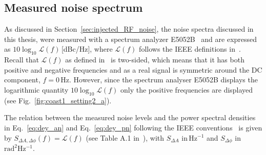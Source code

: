 

\subsection{Measured noise spectrum}

As discussed in Section~\ref{sec:injected_RF_noise}, the noise spectra discussed in this thesis, were measured with a spectrum analyzer E5052B~\cite{E5052B_insight} and are expressed as $10\log_{10}\mathcal{L}(f)$\,[dBc/Hz], where $\mathcal{L}(f)$ follows the IEEE definitions in~\cite{IEEE:4797525}. Recall that $\mathcal{L}(f)$ as defined in~\cite{IEEE:4797525} is two-sided, which means that it has both positive and negative frequencies and as a real signal is symmetric around the DC component, $f=0$\,Hz. However, since the spectrum analyser E5052B displays the logarithmic quantity $10\log_{10}\mathcal{L}(f)$ only the positive frequencies are displayed (see Fig.~\ref{fig:coast1_setting2_a}).

The relation between the measured noise levels and the power spectral densities in Eq.~\eqref{eq:dey_an} and Eq.~\eqref{eq:dey_pn} following the IEEE conventions~\cite{IEEE:4797525} is given by $S_{\Delta A, \Delta \phi}(f) = \mathcal{L}(f)$ (see Table A.1 in~\cite{IEEE:4797525}), with $S_{\Delta A}$ in\,Hz$^{-1}$ and $S_{\Delta \phi}$ in $\mathrm{rad^2 Hz^{-1}}$. 



